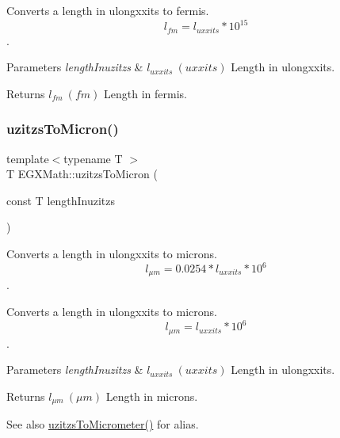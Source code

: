 Converts a length in ulongxxits to fermis. \[ l_{fm}=l_{uxxits} * 10^{15} \].


\begin{DoxyParams}{Parameters}
{\em length\+Inuzitzs} & $ l_{uxxits}\ (uxxits)$ Length in ulongxxits. \\
\hline
\end{DoxyParams}
\begin{DoxyReturn}{Returns}
$ l_{fm}\ (fm)$ Length in fermis. 
\end{DoxyReturn}
\mbox{\label{group___e_g_x_math-_conversions-_length_conversions-_imperial-uzitzs-_non-_s_i_ga695a8fd8870537930d6378e99ad2aa9f}} 
\subsubsection{\texorpdfstring{uzitzs\+To\+Micron()}{uzitzsToMicron()}}
{\footnotesize\ttfamily template$<$typename T $>$ \\
T E\+G\+X\+Math\+::uzitzs\+To\+Micron (\begin{DoxyParamCaption}\item[{const T}]{length\+Inuzitzs }\end{DoxyParamCaption})}



Converts a length in ulongxxits to microns. \[ l_{\mu m}=0.0254 * l_{uxxits} * 10^{6} \]. 

Converts a length in ulongxxits to microns. \[ l_{\mu m}=l_{uxxits} * 10^{6} \].


\begin{DoxyParams}{Parameters}
{\em length\+Inuzitzs} & $ l_{uxxits}\ (uxxits)$ Length in ulongxxits. \\
\hline
\end{DoxyParams}
\begin{DoxyReturn}{Returns}
$ l_{\mu m}\ (\mu m)$ Length in microns. 
\end{DoxyReturn}
\begin{DoxySeeAlso}{See also}
\mbox{\hyperlink{group___e_g_x_math-_conversions-_length_conversions-_imperial-uzitzs-_s_i_ga0bd484a80b8b66cd5272bbbc1fe6b642}{uzitzs\+To\+Micrometer()}} for alias. 
\end{DoxySeeAlso}
\mbox{\label{group___e_g_x_math-_conversions-_length_conversions-_imperial-uzitzs-_non-_s_i_ga64b556911b0bb06cf315aa02f5e2d379}} 
